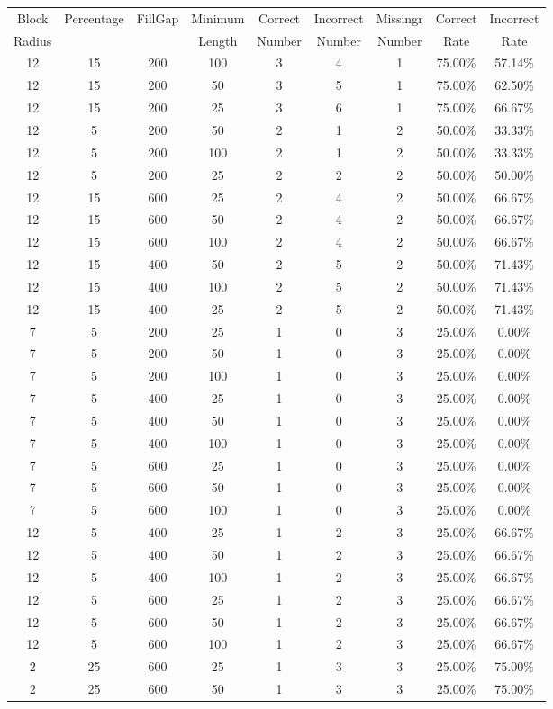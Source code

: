 \clearpage
\begingroup
\setlength{\LTleft}{-20cm plus -1fill}
\setlength{\LTright}{\LTleft}
{\small
\begin{longtable}{| c | c | c | c | c | c | c | c | c |} \hline
Block & Percentage & FillGap & Minimum & Correct & Incorrect & Missingr & Correct & Incorrect \\
Radius &  & & Length & Number & Number & Number & Rate & Rate \\ \hline
12&15&200&100&3&4&1&75.00\%&57.14\%\\
12&15&200&50&3&5&1&75.00\%&62.50\%\\
12&15&200&25&3&6&1&75.00\%&66.67\%\\
12&5&200&50&2&1&2&50.00\%&33.33\%\\
12&5&200&100&2&1&2&50.00\%&33.33\%\\
12&5&200&25&2&2&2&50.00\%&50.00\%\\
12&15&600&25&2&4&2&50.00\%&66.67\%\\
12&15&600&50&2&4&2&50.00\%&66.67\%\\
12&15&600&100&2&4&2&50.00\%&66.67\%\\
12&15&400&50&2&5&2&50.00\%&71.43\%\\
12&15&400&100&2&5&2&50.00\%&71.43\%\\
12&15&400&25&2&5&2&50.00\%&71.43\%\\
7&5&200&25&1&0&3&25.00\%&0.00\%\\
7&5&200&50&1&0&3&25.00\%&0.00\%\\
7&5&200&100&1&0&3&25.00\%&0.00\%\\
7&5&400&25&1&0&3&25.00\%&0.00\%\\
7&5&400&50&1&0&3&25.00\%&0.00\%\\
7&5&400&100&1&0&3&25.00\%&0.00\%\\
7&5&600&25&1&0&3&25.00\%&0.00\%\\
7&5&600&50&1&0&3&25.00\%&0.00\%\\
7&5&600&100&1&0&3&25.00\%&0.00\%\\
12&5&400&25&1&2&3&25.00\%&66.67\%\\
12&5&400&50&1&2&3&25.00\%&66.67\%\\
12&5&400&100&1&2&3&25.00\%&66.67\%\\
12&5&600&25&1&2&3&25.00\%&66.67\%\\
12&5&600&50&1&2&3&25.00\%&66.67\%\\
12&5&600&100&1&2&3&25.00\%&66.67\%\\
2&25&600&25&1&3&3&25.00\%&75.00\%\\
2&25&600&50&1&3&3&25.00\%&75.00\%\\

\end{longtable}}
